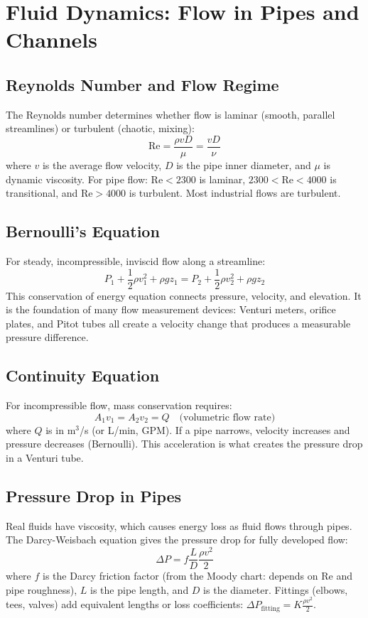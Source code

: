 \documentclass[11pt,letterpaper,twoside,openany]{book}
\begin{document}
\section{Fluid Dynamics: Flow in Pipes and Channels}

\subsection{Reynolds Number and Flow Regime}
The Reynolds number determines whether flow is laminar (smooth, parallel streamlines) or turbulent (chaotic, mixing):
\begin{equation}
\text{Re} = \frac{\rho v D}{\mu} = \frac{v D}{\nu}
\end{equation}
where $v$ is the average flow velocity, $D$ is the pipe inner diameter, and $\mu$ is dynamic viscosity. For pipe flow: $\text{Re} < 2300$ is laminar, $2300 < \text{Re} < 4000$ is transitional, and $\text{Re} > 4000$ is turbulent. Most industrial flows are turbulent.

\subsection{Bernoulli's Equation}
For steady, incompressible, inviscid flow along a streamline:
\begin{equation}
P_1 + \frac{1}{2}\rho v_1^2 + \rho g z_1 = P_2 + \frac{1}{2}\rho v_2^2 + \rho g z_2
\end{equation}
This conservation of energy equation connects pressure, velocity, and elevation. It is the foundation of many flow measurement devices: Venturi meters, orifice plates, and Pitot tubes all create a velocity change that produces a measurable pressure difference.

\subsection{Continuity Equation}
For incompressible flow, mass conservation requires:
\begin{equation}
A_1 v_1 = A_2 v_2 = Q \quad \text{(volumetric flow rate)}
\end{equation}
where $Q$ is in m$^3$/s (or L/min, GPM). If a pipe narrows, velocity increases and pressure decreases (Bernoulli). This acceleration is what creates the pressure drop in a Venturi tube.

\subsection{Pressure Drop in Pipes}
Real fluids have viscosity, which causes energy loss as fluid flows through pipes. The Darcy-Weisbach equation gives the pressure drop for fully developed flow:
\begin{equation}
\Delta P = f \frac{L}{D} \frac{\rho v^2}{2}
\end{equation}
where $f$ is the Darcy friction factor (from the Moody chart: depends on Re and pipe roughness), $L$ is the pipe length, and $D$ is the diameter. Fittings (elbows, tees, valves) add equivalent lengths or loss coefficients: $\Delta P_{\text{fitting}} = K \frac{\rho v^2}{2}$.
\end{document}

